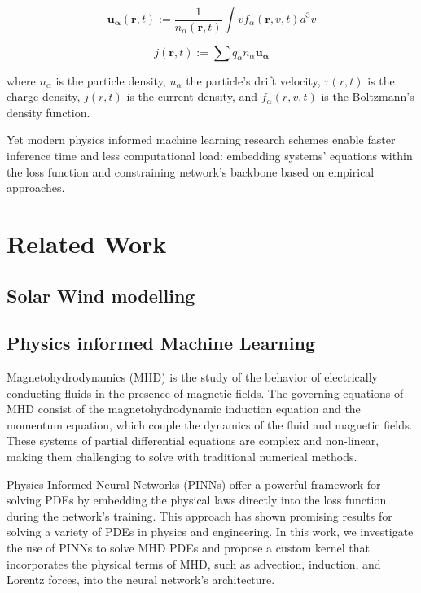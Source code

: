 \documentclass[12pt]{article}
\begin{document}
\begin{equation}
    \mathbf{u_{\alpha}} (\mathbf{r}, t) := \frac{1}{n_{\alpha}(\mathbf{r}, t)} \int v f_{\alpha}(\mathbf{r}, v, t) d^3v
\end{equation}

\begin{equation}
    j(\mathbf{r}, t) := \sum q_{\alpha} n_{\alpha} \mathbf{u_{\alpha}}
\end{equation}

where $n_{\alpha}$ is the particle density, $u_{\alpha}$ the particle's drift velocity, $\tau(r, t)$ is the charge density, $j(r, t)$ is the current density, and $f_{\alpha}(r, v, t)$ is the Boltzmann's density function.

Yet modern physics informed machine learning research schemes enable faster inference time and less computational load: embedding systems' equations within the loss function and constraining network's backbone based on empirical approaches.

\section{Related Work}

\subsection{Solar Wind modelling}

\subsection{Physics informed Machine Learning}

Magnetohydrodynamics (MHD) is the study of the behavior of electrically conducting fluids in the presence of magnetic fields. The governing equations of MHD consist of the magnetohydrodynamic induction equation and the momentum equation, which couple the dynamics of the fluid and magnetic fields. These systems of partial differential equations are complex and non-linear, making them challenging to solve with traditional numerical methods.

Physics-Informed Neural Networks (PINNs) offer a powerful framework for solving PDEs by embedding the physical laws directly into the loss function during the network's training. This approach has shown promising results for solving a variety of PDEs in physics and engineering. In this work, we investigate the use of PINNs to solve MHD PDEs and propose a custom kernel that incorporates the physical terms of MHD, such as advection, induction, and Lorentz forces, into the neural network's architecture.
\end{document}
